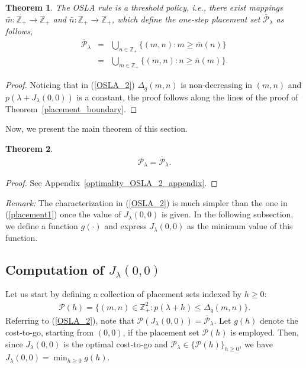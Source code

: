 \documentclass[conference]{IEEEtran}
\newtheorem{theorem}{Theorem}
\begin{document}
\begin{theorem} 
The OSLA rule is a threshold policy, i.e., there exist mappings  
$\bar{m}:\mathbb{Z}_+\rightarrow \mathbb{Z}_+$ and  $\bar{n}:\mathbb{Z}_+\rightarrow \mathbb{Z}_+$, 
which define the one-step placement set $\overline{\mathcal{P}}_{\lambda}$ as follows, 
\begin{eqnarray}
\overline{\mathcal{P}}_\lambda&=&\bigcup_{n\in\mathbb{Z}_+}\{(m,n): m\geq \bar{m}(n)\}\label{OSLA2_1}\\
&=&\bigcup_{m\in\mathbb{Z}_+}\{(m,n): n\geq \bar{n}(m)\}\label{OSLA2_2}.
\end{eqnarray}
\end{theorem}
\begin{proof}
  Noticing that in (\ref{OSLA_2}) $\Delta_q(m,n)$ is non-decreasing in
  $(m,n)$ and $p(\lambda+J_{\lambda}(0,0))$ is a constant, the proof
  follows along the lines of the proof of
  Theorem~\ref{placement_boundary}.
\end{proof}

Now, we present the main theorem of this section.
\begin{theorem} 
\label{optimality_OSLA_2}
\begin{eqnarray*}
\mathcal{P}_\lambda=\overline{\mathcal{P}}_\lambda.
\end{eqnarray*}
\end{theorem}
\begin{proof}
See Appendix~\ref{optimality_OSLA_2_appendix}.
\end{proof}

\emph{Remark:} The characterization in (\ref{OSLA_2}) is much simpler than the one in (\ref{placement1}) 
once the value of $J_{\lambda}(0,0)$ is given. In the following subsection, we define a function
 $g(\cdot)$ and express 
$J_{\lambda}(0,0)$ as the minimum value of this function. 

\subsection{Computation of $J_{\lambda}(0,0)$}
\label{calculation_cost_section}
Let us start by defining a collection of placement sets indexed by $h \geq 0$:
\begin{eqnarray} \label{NLOS_Placement}
{\mathcal P}(h) = \{(m,n)\in\mathbb{Z}_+^2: p(\lambda + h) \leq\Delta_q(m,n)\}.
\end{eqnarray}
Referring to (\ref{OSLA_2}), note that ${\mathcal P}(J_{\lambda}(0,0))=\overline{\mathcal{P}}_\lambda$. Let
$g(h)$ denote the cost-to-go, starting from $(0,0)$, if the placement set $\mathcal{P}(h)$ is employed. 
Then, since $J_{\lambda}(0,0)$ is the optimal cost-to-go and 
$\mathcal{P}_\lambda \in \{{\mathcal P}(h) \}_{h\geq 0}$, we have $J_{\lambda}(0,0)=\min_{h\geq 0}g(h)$. 
\end{document}
